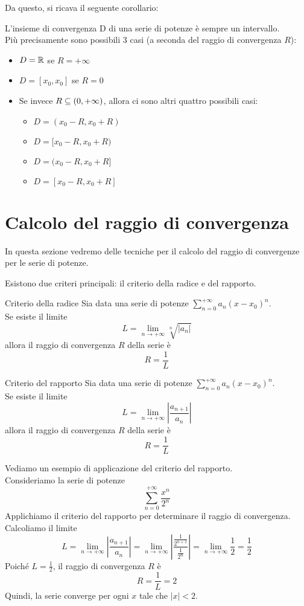 Da questo, si ricava il seguente corollario:
\begin{corollario}{}
  L'insieme di convergenza D di una serie di potenze è sempre un intervallo.\\
  Più precisamente sono possibili 3 casi (a seconda del raggio di convergenza $R$):
  \begin{itemize}
  \item $D = \mathbb{R}$ se $R = +\infty$
  \item $D = [x_0,x_0]$ se $R = 0$
  \item Se invece $R \subseteq (0,+\infty)$, allora ci sono altri quattro possibili casi:
  \begin{itemize}
  \item $D = (x_0-R,x_0+R)$
  \item $D = [x_0-R,x_0+R)$
  \item $D = (x_0-R,x_0+R]$
  \item $D = [x_0-R,x_0+R]$
  \end{itemize}
  \end{itemize}
\end{corollario}

\section{Calcolo del raggio di convergenza}
In questa sezione vedremo delle tecniche per il calcolo del raggio di convergenze per le serie di potenze.

Esistono due criteri principali: il criterio della radice e del rapporto.

\begin{teorema}{Criterio della radice}
  Sia data una serie di potenze $\sum_{n=0}^{+\infty} a_n (x-x_0)^n$.\\
  Se esiste il limite
  \[
      L = \lim_{n \to +\infty} \sqrt[n]{\lvert a_n \rvert}
  \]
  allora il raggio di convergenza $R$ della serie è
  \[
      R = \frac{1}{L}
  \]
\end{teorema}

\begin{teorema}{Criterio del rapporto}
  Sia data una serie di potenze $\sum_{n=0}^{+\infty} a_n (x-x_0)^n$.\\
  Se esiste il limite
  \[
      L = \lim_{n \to +\infty} \left\lvert \frac{a_{n+1}}{a_n} \right\rvert
  \]
  allora il raggio di convergenza $R$ della serie è
  \[
      R = \frac{1}{L}
  \]
\end{teorema}

Vediamo un esempio di applicazione del criterio del rapporto.\\
  Consideriamo la serie di potenze
  \[
      \sum_{n=0}^{+\infty} \frac{x^n}{2^n}
  \]
  Applichiamo il criterio del rapporto per determinare il raggio di convergenza.\\
  Calcoliamo il limite
  \[
      L = \lim_{n \to +\infty} \left\lvert \frac{a_{n+1}}{a_n} \right\rvert = \lim_{n \to +\infty} \left\lvert \frac{\frac{1}{2^{n+1}}}{\frac{1}{2^n}} \right\rvert = \lim_{n \to +\infty} \frac{1}{2} = \frac{1}{2}
  \]
  Poiché $L = \frac{1}{2}$, il raggio di convergenza $R$ è
  \[
      R = \frac{1}{L} = 2
  \]
  Quindi, la serie converge per ogni $x$ tale che $\lvert x \rvert < 2$.

